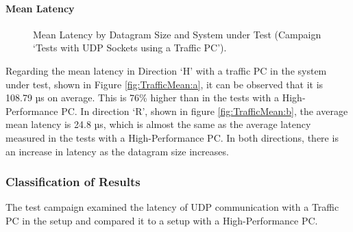 \paragraph{Mean Latency}
\begin{figure}[h!]
  \centering
  \caption{Mean Latency by Datagram Size and System under Test (Campaign `Tests with UDP Sockets using a Traffic PC').}
  \label{fig:TrafficMean}
\end{figure}

Regarding the mean latency in Direction `H' with a traffic PC in the system under test, shown in Figure \ref{fig:TrafficMean:a}, it can be observed that it is 108.79 µs on average. This is 76\% higher than in the tests with a High-Performance PC. In direction `R', shown in figure \ref{fig:TrafficMean:b}, the average mean latency is 24.8 µs, which is almost the same as the average latency measured in the tests with a High-Performance PC. In both directions, there is an increase in latency as the datagram size increases.

\subsubsection{Classification of Results}
The test campaign examined the latency of UDP communication with a Traffic PC in the setup and compared it to a setup with a High-Performance PC.

